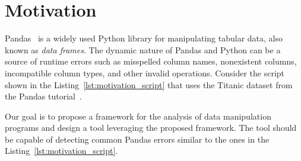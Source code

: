 \section{Motivation}

Pandas~\cite{pandas_docs} is a widely used Python library for manipulating tabular data,
also known as \emph{data frames}.
The dynamic nature of Pandas and Python can be a source of runtime errors such as misspelled column names, nonexistent
columns, incompatible column types, and other invalid operations.
Consider the script shown in the Listing~\ref{lst:motivation_script}
that uses the Titanic dataset from the Pandas tutorial~\cite{pandas_statistics_2020}.




Our goal is to propose a framework for the analysis of data manipulation programs and design a tool
leveraging the proposed framework.
The tool should be capable of detecting common Pandas errors similar to the ones in the Listing~\ref{lst:motivation_script}.

